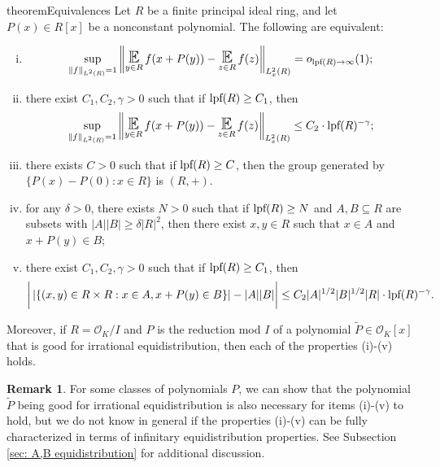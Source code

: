 \documentclass{amsart}
\theoremstyle{definition}
\newtheorem{remark}[theorem]{Remark}
\numberwithin{equation}{section}
\newcommand{\mO}{\mathcal{O}}
\newcommand{\lpf}{\normalfont\text{lpf}}
\renewcommand{\tilde}{\widetilde}
\DeclareMathOperator*{\E}{\text{\Large $\mathbb{E}$}}
\newcommand{\norm}[2]{\left\| #2 \right\|_{#1}}
\begin{document}
\begin{restatable}{theorem}{Equivalences} \label{thm: equivalences}
    Let $R$ be a finite principal ideal ring, and let $P(x) \in R[x]$ be a nonconstant polynomial.
	The following are equivalent:
	\begin{enumerate}[(i)]
		\item
			\begin{equation*}
				\sup_{\norm{L^2(R)}{f} = 1}{\norm{L^2_x(R)}{\E_{y \in R}{f(x+P(y))} - \E_{z \in R}{f(z)}}}
				 = o_{\lpf(R) \to \infty}(1);
			\end{equation*}
		\item	there exist $C_1, C_2, \gamma > 0$ such that if $\lpf(R) \ge C_1$, then
			\begin{equation*}
				\sup_{\norm{L^2(R)}{f} = 1}{\norm{L^2_x(R)}{\E_{y \in R}{f(x+P(y))} - \E_{z \in R}{f(z)}}}
				 \le C_2 \cdot \lpf(R)^{-\gamma};
			\end{equation*}
		\item there exists $C > 0$ such that if $\lpf(R) \ge C$, then the group generated by $\{P(x) - P(0) : x \in R\}$ is $(R, +)$.
		\item	for any $\delta > 0$, there exists $N > 0$ such that if $\lpf(R) \ge N$ and $A, B \subseteq R$ are subsets with $|A| |B| \ge \delta |R|^2$, then there exist $x, y \in R$ such that $x \in A$ and $x + P(y) \in B$;
		\item	there exist $C_1, C_2, \gamma > 0$ such that if $\lpf(R) \ge C_1$, then
			\begin{equation*}
				\bigg| \left| \left\{ (x,y) \in R \times R : x \in A, x + P(y) \in B \right\} \right| - |A| |B| \bigg|
				 \le C_2 |A|^{1/2} |B|^{1/2} |R| \cdot \lpf(R)^{-\gamma}.
			\end{equation*}
	\end{enumerate}
	Moreover, if $R = \mO_K/I$ and $P$ is the reduction mod $I$ of a polynomial $\tilde{P} \in \mO_K[x]$ that is good for irrational equidistribution, then each of the properties (i)-(v) holds.
\end{restatable}

\begin{remark}
    For some classes of polynomials $P$, we can show that the polynomial $\tilde{P}$ being good for irrational equidistribution is also necessary for items (i)-(v) to hold, but we do not know in general if the properties (i)-(v) can be fully characterized in terms of infinitary equidistribution properties.
    See Subsection \ref{sec: A,B equidistribution} for additional discussion.
\end{remark}
\end{document}
